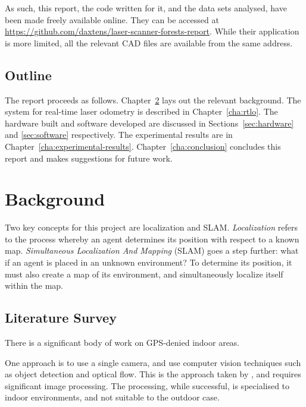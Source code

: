 \documentclass[12pt,oneside,a4paper]{book}
\begin{document}
As such, this report, the code written for it, and the data sets
analysed, have been made freely available online. They can be accessed
at \url{https://github.com/daxtens/laser-scanner-forests-report}.
While their application is more limited, all the relevant CAD files
are available from the same address.


\section{Outline}
\label{sec:outline}

The report proceeds as follows.  Chapter~\ref{cha:background} lays out
the relevant background. The system for real-time laser odometry is
described in Chapter~\ref{cha:rtlo}. The hardware built and software
developed are discussed in Sections~\ref{sec:hardware} and
\ref{sec:software} respectively. The experimental results are in
Chapter~\ref{cha:experimental-results}.  Chapter~\ref{cha:conclusion}
concludes this report and makes suggestions for future work.

\chapter{Background}
\label{cha:background}

Two key concepts for this project are localization and
SLAM. \emph{Localization} refers to the process whereby an agent
determines its position with respect to a known
map. \emph{Simultaneous Localization And Mapping} (SLAM) goes a step
further: what if an agent is placed in an unknown environment? To
determine its position, it must also create a map of its environment,
and simultaneously localize itself within the map.

\section{Literature Survey}
\label{sec:litsurvey}

There is a significant body of work on GPS-denied indoor areas.

One approach is to use a single camera, and use computer vision
techniques such as object detection and optical flow. This is the
approach taken by \cite{5152680}, and requires significant image
processing. The processing, while successful, is specialised to indoor
environments, and not suitable to the outdoor case.
\end{document}
